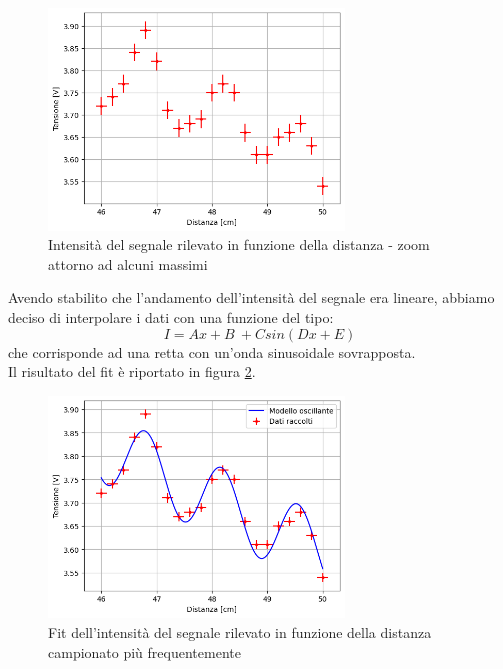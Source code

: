 \documentclass[letterpaper,12pt]{article}
\begin{document}
\begin{figure}[h!]
	\centering
	\includegraphics[width = 0.7\textwidth]{dati_distanza_ondulatori.png}
	\caption{Intensità del segnale rilevato in funzione della distanza - zoom attorno ad alcuni massimi}
	\label{fig:distanza_zoom}
\end{figure}

Avendo stabilito che l'andamento dell'intensità del segnale era lineare, abbiamo deciso di interpolare i dati con una funzione del tipo:
\begin{equation}
	I = Ax + B\ + Csin(Dx + E)
	\label{eq:modello_oscillante}
\end{equation}
che corrisponde ad una retta con un'onda sinusoidale sovrapposta.\\
Il risultato del fit è riportato in figura \ref{fig:fit_distanza_ondulatori}.

\begin{figure}[h!]
	\centering
	\includegraphics[width = 0.7\textwidth]{fit_distanza_ondulatori.png}
	\caption{Fit dell'intensità del segnale rilevato in funzione della distanza campionato più frequentemente}
	\label{fig:fit_distanza_ondulatori}
\end{figure}
\end{document}
